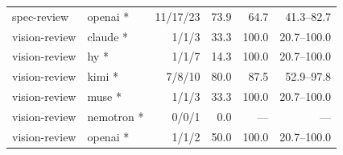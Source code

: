 \documentclass[
  10pt,
  a4paper,
]{article}
\begin{document}
\begin{longtable}[]{@{}llrrrr@{}}
spec-review & openai * & 11/17/23 & 73.9 & 64.7 & 41.3--82.7 \\
vision-review & claude * & 1/1/3 & 33.3 & 100.0 & 20.7--100.0 \\
vision-review & hy * & 1/1/7 & 14.3 & 100.0 & 20.7--100.0 \\
vision-review & kimi * & 7/8/10 & 80.0 & 87.5 & 52.9--97.8 \\
vision-review & muse * & 1/1/3 & 33.3 & 100.0 & 20.7--100.0 \\
vision-review & nemotron * & 0/0/1 & 0.0 & --- & --- \\
vision-review & openai * & 1/1/2 & 50.0 & 100.0 & 20.7--100.0 \\
\end{longtable}

\renewcommand\refname{References}

\end{document}
